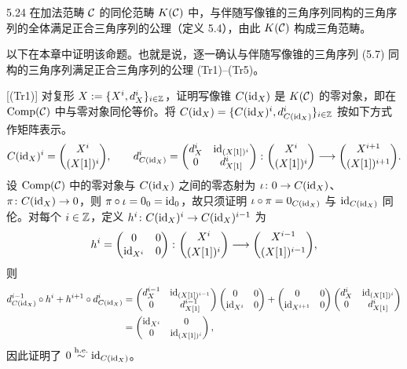 
\begin{proposition}{5.24}
在加法范畴 $\mathcal{C}$ 的同伦范畴 $K(\mathcal{C})$ 中，与伴随写像锥的三角序列同构的三角序列的全体满足正合三角序列的公理（定义 5.4），由此 $K(\mathcal{C})$ 构成三角范畴。
\end{proposition}

以下在本章中证明该命题。也就是说，逐一确认与伴随写像锥的三角序列 (5.7) 同构的三角序列满足正合三角序列的公理 (Tr1)–(Tr5)。

[(Tr1)] 对复形 $X := \{X^i,d^i_X\}_{i\in\mathbb{Z}}$，证明写像锥 $C(\mathrm{id}_X)$ 是 $K(\mathcal{C})$ 的零对象，即在 $\operatorname{Comp}(\mathcal{C})$ 中与零对象同伦等价。将 $C(\mathrm{id}_X) = \{C(\mathrm{id}_X)^i, d^i_{C(\mathrm{id}_X)}\}_{i\in\mathbb{Z}}$ 按如下方式作矩阵表示。
\[
C(\mathrm{id}_X)^i = \binom{X^i}{(X[1])^i},\qquad
d^i_{C(\mathrm{id}_X)} = \begin{pmatrix} d^i_X & \mathrm{id}_{(X[1])^i} \\ 0 & d^i_{X[1]}\end{pmatrix}\colon
\binom{X^i}{(X[1])^i}\longrightarrow\binom{X^{i+1}}{(X[1])^{i+1}}.
\]
设 $\operatorname{Comp}(\mathcal{C})$ 中的零对象与 $C(\mathrm{id}_X)$ 之间的零态射为 $\iota\colon 0\to C(\mathrm{id}_X)$、$\pi\colon C(\mathrm{id}_X)\to 0$，则 $\pi\circ\iota = 0_0 = \mathrm{id}_0$，故只须证明 $\iota\circ\pi = 0_{C(\mathrm{id}_X)}$ 与 $\mathrm{id}_{C(\mathrm{id}_X)}$ 同伦。对每个 $i\in\mathbb{Z}$，定义 $h^i\colon C(\mathrm{id}_X)^i\to C(\mathrm{id}_X)^{i-1}$ 为
\[
h^i = \begin{pmatrix} 0 & 0 \\ \mathrm{id}_{X^i} & 0\end{pmatrix}\colon
\binom{X^i}{(X[1])^i}\longrightarrow\binom{X^{i-1}}{(X[1])^{i-1}},
\]
则
\[
\begin{aligned}
d^{i-1}_{C(\mathrm{id}_X)}\circ h^i + h^{i+1}\circ d^i_{C(\mathrm{id}_X)}
&= \begin{pmatrix} d^{i-1}_X & \mathrm{id}_{(X[1])^{i-1}} \\ 0 & d^{i-1}_{X[1]}\end{pmatrix}\begin{pmatrix} 0 & 0 \\ \mathrm{id}_{X^i} & 0\end{pmatrix}
+ \begin{pmatrix} 0 & 0 \\ \mathrm{id}_{X^{i+1}} & 0\end{pmatrix}\begin{pmatrix} d^i_X & \mathrm{id}_{(X[1])^i} \\ 0 & d^i_{X[1]}\end{pmatrix}\\
&= \begin{pmatrix} \mathrm{id}_{X^i} & 0 \\ 0 & \mathrm{id}_{(X[1])^i}\end{pmatrix},
\end{aligned}
\]
因此证明了 $0\overset{\mathrm{h.e.}}{\sim}\mathrm{id}_{C(\mathrm{id}_X)}$。

